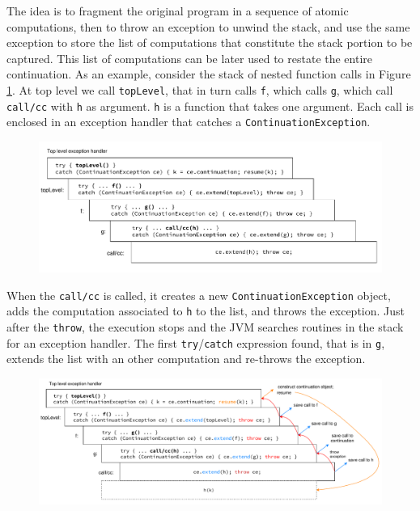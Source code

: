 \documentclass[12pt,a4paper,oneside,openright]{book}
\begin{document}
The idea is to fragment the original program in a sequence of atomic
computations, then to throw an exception to unwind the stack, and use
the same exception to store the list of computations that constitute the
stack portion to be captured. This list of computations can be later
used to restate the entire continuation. As an example, consider the
stack of nested function calls in Figure \ref{stack}. At top level we
call \texttt{topLevel}, that in turn calls \texttt{f}, which calls
\texttt{g}, which call \texttt{call/cc} with \texttt{h} as argument.
\texttt{h} is a function that takes one argument. Each call is enclosed
in an exception handler that catches a \texttt{ContinuationException}.

\begin{figure}[htbp]
\centering
\includegraphics{figures/stack.pdf}
\caption{\label{stack}}
\end{figure}

When the \texttt{call/cc} is called, it creates a new
\texttt{ContinuationException} object, adds the computation associated
to \texttt{h} to the list, and throws the exception. Just after the
\texttt{throw}, the execution stops and the JVM searches routines in the
stack for an exception handler. The first \texttt{try}/\texttt{catch}
expression found, that is in \texttt{g}, extends the list with an other
computation and re-throws the exception.

\begin{figure}[htbp]
\centering
\includegraphics{figures/stack_mod.pdf}
\caption{\label{stack-mod}}
\end{figure}
\end{document}
